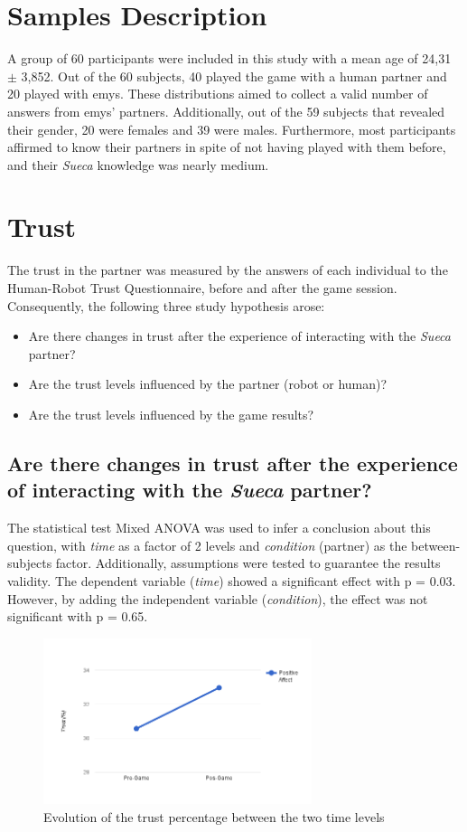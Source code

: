 \section{Samples Description}
\label{sec:samples}
A group of 60 participants were included in this study with a mean age of 24,31 $\pm$ 3,852.
Out of the 60 subjects, 40 played the game with a human partner and 20 played with \ac{emys}.
These distributions aimed to collect a valid number of answers from \ac{emys}' partners.
Additionally, out of the 59 subjects that revealed their gender, 20 were females and 39 were males.
Furthermore, most participants affirmed to know their partners in spite of not having played with them before, and their \emph{Sueca} knowledge was nearly medium.

\section{Trust}
\label{sec:trust}
The trust in the partner was measured by the answers of each individual to the Human-Robot Trust Questionnaire, before and after the game session.
Consequently, the following three study hypothesis arose:
\begin{itemize}
\item Are there changes in trust after the experience of interacting with the \emph{Sueca} partner?
\item Are the trust levels influenced by the partner (robot or human)?
\item Are the trust levels influenced by the game results?
\end{itemize}


\subsection*{Are there changes in trust after the experience of interacting with the \emph{Sueca} partner?}
The statistical test Mixed ANOVA was used to infer a conclusion about this question, with \emph{time} as a factor of 2 levels and \emph{condition} (partner) as the between-subjects factor.
Additionally, assumptions were tested to guarantee the results validity.
The dependent variable (\emph{time}) showed a significant effect with p = 0.03.
However, by adding the independent variable (\emph{condition}), the effect was not significant with p = 0.65.

\begin{figure}[h!]
  \centering
    \includegraphics[width=0.7\textwidth]{./img/7/trustTime}
  \caption{Evolution of the trust percentage between the two time levels}
\label{fig:trustTime}
\end{figure}

